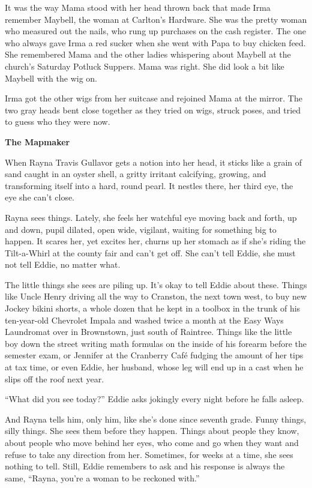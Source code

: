 \documentclass[
]{article}
\begin{document}
It was the way Mama stood with her head thrown back that made Irma
remember Maybell, the woman at Carlton's Hardware. She was the pretty
woman who measured out the nails, who rung up purchases on the cash
register. The one who always gave Irma a red sucker when she went with
Papa to buy chicken feed. She remembered Mama and the other ladies
whispering about Maybell at the church's Saturday Potluck Suppers. Mama
was right. She did look a bit like Maybell with the wig on.

Irma got the other wigs from her suitcase and rejoined Mama at the
mirror. The two gray heads bent close together as they tried on wigs,
struck poses, and tried to guess who they were now.

\textbf{The Mapmaker}

When Rayna Travis Gullavor gets a notion into her head, it sticks like a
grain of sand caught in an oyster shell, a gritty irritant calcifying,
growing, and transforming itself into a hard, round pearl. It nestles
there, her third eye, the eye she can't close.

Rayna sees things. Lately, she feels her watchful eye moving back and
forth, up and down, pupil dilated, open wide, vigilant, waiting for
something big to happen. It scares her, yet excites her, churns up her
stomach as if she's riding the Tilt-a-Whirl at the county fair and can't
get off. She can't tell Eddie, she must not tell Eddie, no matter what.

The little things she sees are piling up. It's okay to tell Eddie about
these. Things like Uncle Henry driving all the way to Cranston, the next
town west, to buy new Jockey bikini shorts, a whole dozen that he kept
in a toolbox in the trunk of his ten-year-old Chevrolet Impala and
washed twice a month at the Easy Ways Laundromat over in Brownstown,
just south of Raintree. Things like the little boy down the street
writing math formulas on the inside of his forearm before the semester
exam, or Jennifer at the Cranberry Café fudging the amount of her tips
at tax time, or even Eddie, her husband, whose leg will end up in a cast
when he slips off the roof next year.

``What did you see today?'' Eddie asks jokingly every night before he
falls asleep.

And Rayna tells him, only him, like she's done since seventh grade.
Funny things, silly things. She sees them before they happen. Things
about people they know, about people who move behind her eyes, who come
and go when they want and refuse to take any direction from her.
Sometimes, for weeks at a time, she sees nothing to tell. Still, Eddie
remembers to ask and his response is always the same, ``Rayna, you're a
woman to be reckoned with.''
\end{document}
